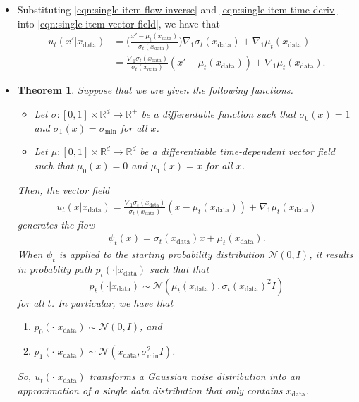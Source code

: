 \documentclass[10pt]{article}
\newtheorem{theorem}[lemma]{Theorem}
\newcommand{\ra}{\rightarrow}
\newcommand{\mcal}[1]{\mathcal{#1}}
\newcommand{\Real}{\mathbb{R}}
\newcommand{\data}{\mathrm{data}}
\begin{document}
\begin{itemize}
  \item Substituting \eqref{eqn:single-item-flow-inverse} and \eqref{eqn:single-item-time-deriv} into \eqref{eqn:single-item-vector-field}, we have that
  \begin{align*}
    u_t(x'|x_{\data}) 
    &= \bigg( \frac{x' - \mu_t(x_{\data})}{\sigma_t(x_{\data})} \bigg) \nabla_1 \sigma_t(x_{\data}) + \nabla_1 \mu_t(x_{\data}) \\
    &= \frac{\nabla_1 \sigma_t(x_{\data})}{\sigma_t(x_{\data})}(x' - \mu_t(x_{\data})) + \nabla_1 \mu_t(x_{\data}).
  \end{align*}

  \item \begin{theorem}
    Suppose that we are given the following functions.
    \begin{itemize}
      \item Let $\sigma: [0,1] \times \Real^d \ra \Real^+$ be a differentable function such that $\sigma_0(x) = 1$ and $\sigma_1(x) = \sigma_{\min}$ for all $x$.
      \item Let $\mu: [0,1] \times \Real^d \ra \Real^d$ be a differentiable time-dependent vector field such that $\mu_0(x) = 0$ and $\mu_1(x) = x$ for all $x$.
    \end{itemize}
    Then, the vector field
    \begin{align*}
      u_t(x|x_{\data}) = \frac{\nabla_1 \sigma_t(x_{\data})}{\sigma_t(x_{\data})}(x - \mu_t(x_{\data})) + \nabla_1 \mu_t(x_{\data})
    \end{align*}
    generates the flow
    \begin{align*}
      \psi_t(x) = \sigma_t(x_{\data}) x + \mu_t(x_{\data}).
    \end{align*}
    When $\psi_t$ is applied to the starting probability distribution $\mcal{N}(0,I)$, it results in probablity path $p_t(\cdot|x_{\data})$ such that that $$p_t(\cdot|x_{\data}) \sim \mcal{N}(\mu_t(x_{\data}), \sigma_t(x_{\data})^2 I)$$ for all $t$. In particular, we have that
    \begin{enumerate}
      \item $p_0(\cdot|x_{\data}) \sim \mcal{N}(0,I)$, and 
      \item $p_1(\cdot|x_{\data}) \sim \mcal{N}(x_{\data}, \sigma_{\min}^2 I)$.      
    \end{enumerate}
    So, $u_t(\cdot|x_{\data})$ transforms a Gaussian noise distribution into an approximation of a single data distribution that only contains $x_{\data}$.
  \end{theorem}
\end{itemize}
\end{document}
